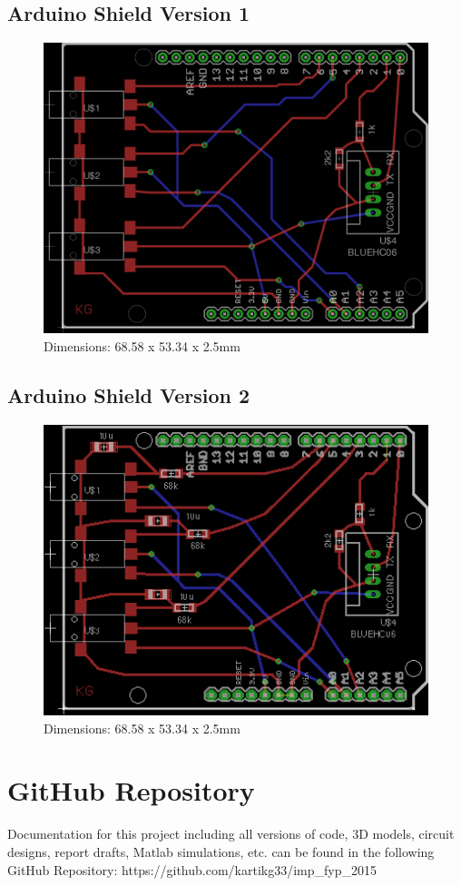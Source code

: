 \subsection{Arduino Shield Version 1}
\label{ardshieldpcb}
\begin{figure}[H]
\centering
\includegraphics[scale = 1.5]{Images/ard_pcb_01}
\\ Dimensions: 68.58 x 53.34 x 2.5mm
\end{figure}

\subsection{Arduino Shield Version 2}
\label{ardshieldpcb2}
\begin{figure}[H]
\centering
\includegraphics[scale = 1.5]{Images/ard_pcb_02}
\\ Dimensions: 68.58 x 53.34 x 2.5mm
\end{figure}


\section{GitHub Repository}

Documentation for this project including all versions of code, 3D models, circuit designs, report drafts, Matlab simulations, etc. can be found in the following GitHub Repository: https://github.com/kartikg33/imp\_fyp\_2015



